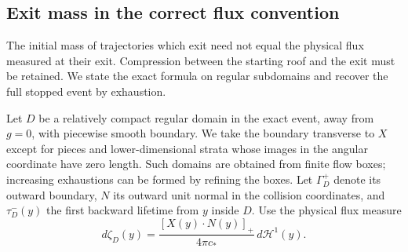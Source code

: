 \subsection{Exit mass in the correct flux convention}
The initial mass of trajectories which exit need not equal the
physical flux measured at their exit. Compression between the starting
roof and the exit must be retained. We state the exact formula on
regular subdomains and recover the full stopped event by exhaustion.

Let $D$ be a relatively compact regular domain in the exact event,
away from $g=0$, with piecewise smooth boundary. We take the boundary
transverse to $X$ except for pieces and lower-dimensional strata whose
images in the angular coordinate have zero length. Such domains are
obtained from finite flow boxes; increasing exhaustions can be formed
by refining the boxes. Let $\Gamma_D^+$ denote its outward boundary,
$N$ its outward unit normal in the collision coordinates, and
$\tau_D^-(y)$ the first backward lifetime from $y$ inside $D$.
Use the physical flux measure
\begin{equation}\label{eq:v79-boundary-flux}
 d\zeta_D(y)=\frac{[X(y)\cdot N(y)]_+}{4\pi c_*}\,d\mathcal H^1(y).
\end{equation}

